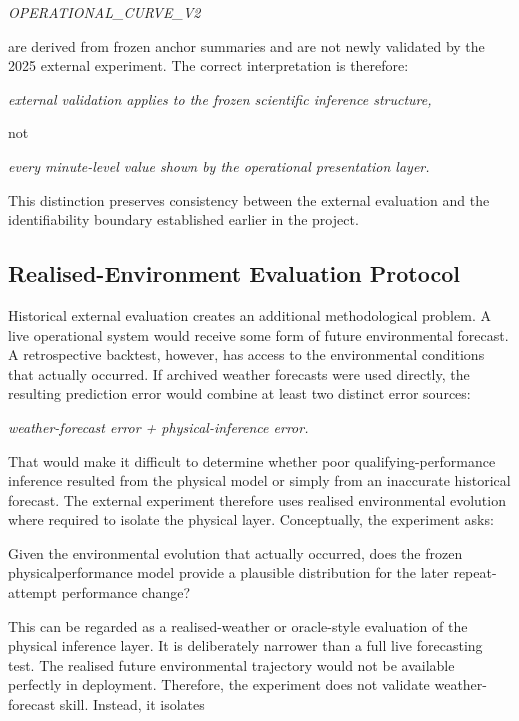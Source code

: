 \begin{center}\textit{OPERATIONAL\_CURVE\_V2}\end{center}

are derived from frozen anchor summaries and are not newly validated by the 2025 external experiment. The correct interpretation is therefore:

\begin{center}\textit{external validation applies to the frozen scientific inference structure,}\end{center}

not

\begin{center}\textit{every minute-level value shown by the operational presentation layer.}\end{center}

This distinction preserves consistency between the external evaluation and the identifiability boundary established earlier in the project.

\subsection{Realised-Environment Evaluation Protocol}
Historical external evaluation creates an additional methodological problem. A live operational system would receive some form of future environmental forecast. A retrospective backtest, however, has access to the environmental conditions that actually occurred. If archived weather forecasts were used directly, the resulting prediction error would combine at least two distinct error sources:

\begin{center}\textit{weather-forecast error + physical-inference error.}\end{center}

That would make it difficult to determine whether poor qualifying-performance inference resulted from the physical model or simply from an inaccurate historical forecast. The external experiment therefore uses realised environmental evolution where required to isolate the physical layer. Conceptually, the experiment asks:

Given the environmental evolution that actually occurred, does the frozen physicalperformance model provide a plausible distribution for the later repeat-attempt performance change?

This can be regarded as a realised-weather or oracle-style evaluation of the physical inference layer. It is deliberately narrower than a full live forecasting test. The realised future environmental trajectory would not be available perfectly in deployment. Therefore, the experiment does not validate weather-forecast skill. Instead, it isolates

